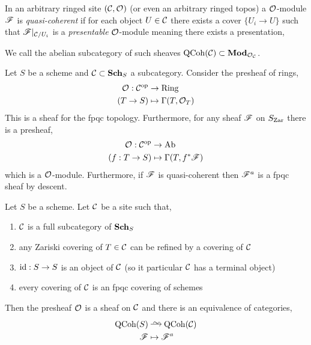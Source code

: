 \documentclass[12pt]{article}
\begin{document}
\begin{defn}
In an arbitrary ringed site $(\mathcal{C}, \mathcal{O}_{})$ (or even an arbitrary ringed topos) a $\mathcal{O}_{}$-module $\mathscr{F}$ is \textit{quasi-coherent} if for each object $U \in \mathcal{C}$ there exists a cover $\{ U_i \to U \}$ such that $\mathscr{F}|_{\mathcal{C} / U_i}$ is a \textit{presentable} $\mathcal{O}_{}$-module meaning there exists a presentation,
\begin{center}
\end{center}
We call the abelian subcategory of such sheaves $\mathrm{QCoh}(\mathcal{C}) \subset \mathbf{Mod}_{\mathcal{O}_{\mathcal{C}}}$.
\end{defn}

\begin{defn}
Let $S$ be a scheme and $\mathcal{C} \subset \mathbf{Sch}_S$ a subcategory. Consider the presheaf of rings,
\begin{align*}
\mathcal{O}_{} : \mathcal{C}^{\mathrm{op}} & \to \mathrm{Ring}
\\
(T \to S)  & \mapsto \Gamma(T, \mathcal{O}_{T}) 
\end{align*}
This is a sheaf for the fpqc topology. Furthermore, for any sheaf $\mathscr{F}$ on $S_{\mathrm{Zar}}$ there is a presheaf,
\begin{align*}
\mathcal{O}_{} : \mathcal{C}^{\mathrm{op}} & \to \mathrm{Ab}
\\
(f : T \to S) & \mapsto \Gamma(T, f^* \mathscr{F})
\end{align*} 
which is a $\mathcal{O}_{}$-module. Furthermore, if $\mathscr{F}$ is quasi-coherent then $\mathscr{F}^a$ is a fpqc sheaf by descent.
\end{defn}

\begin{theorem}
Let $S$ be a scheme. Let $\mathcal{C}$ be a site such that,
\begin{enumerate}
\item $\mathcal{C}$ is a full subcategory of $\mathbf{Sch}_S$
\item any Zariski covering of $T \in \mathcal{C}$ can be refined by a covering of $\mathcal{C}$
\item $\mathrm{id} : S \to S$ is an object of $\mathcal{C}$ (so it particular $\mathcal{C}$ has a terminal object)
\item every covering of $\mathcal{C}$ is an fpqc covering of schemes
\end{enumerate}
Then the presheaf $\mathcal{O}_{}$ is a sheaf on $\mathcal{C}$ and there is an equivalence of categories,
\begin{align*}
\QCoh(S) & \iso \QCoh(\C)
\\
\F & \mapsto \F^a
\end{align*}
\end{theorem}
\end{document}
